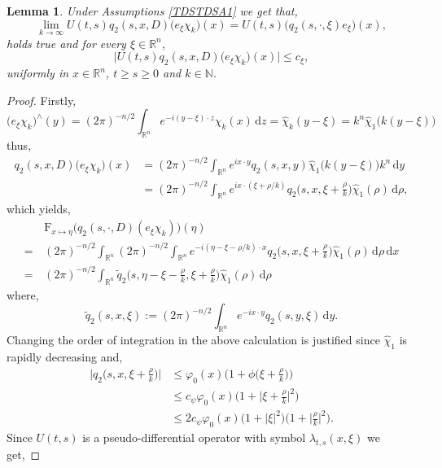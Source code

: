 \documentclass[a4paper, 12pt]{report}
\newtheorem{lemma}[theorem]{Lemma}
\theoremstyle{cor}
\theoremstyle{remark}
\theoremstyle{definition}
\begin{document}
\begin{lemma}\label{TDSSoAPL3}
Under Assumptions \ref{TDSTDSA1} we get that,
$$
\lim_{k \to \infty}U(t, s)q_2(s, x, D)\big(e_\xi\chi_k\big)(x) = U(t, s)\big(q_2(s, \cdot, \xi)e_\xi\big)(x),
$$
holds true and for every $\xi \in \mathbb{R}^n$,
$$
\big|U(t, s)q_2(s, x, D)\big(e_\xi\chi_k\big)(x)\big| \le c_\xi,
$$
uniformly in $x \in \mathbb{R}^n$, $t \ge s \ge 0$ and $k \in \mathbb{N}$.
\end{lemma}
\begin{proof}
Firstly,
$$
\big(e_\xi\chi_k\big)^\wedge(y) = (2\pi)^{-n/2}\int_{\mathbb{R}^n}e^{-i(y - \xi)\cdot z}\chi_k(x)\,\mathrm{d}z = \hat{\chi}_k(y - \xi) = k^n\hat{\chi}_1\big(k(y - \xi)\big)
$$
thus,
$$
\begin{aligned}
q_2(s, x, D)\big(e_\xi\chi_k\big)(x) & = (2\pi)^{-n/2}\int_{\mathbb{R}^n}e^{ix\cdot y}q_2(s, x, y)\hat{\chi}_1\big(k(y - \xi)\big)k^n\,\mathrm{d}y\\
& = (2\pi)^{-n/2}\int_{\mathbb{R}^n}e^{ix\cdot(\xi + \rho/k)}q_2\Big(s, x, \xi + \frac{\rho}{k}\Big)\hat{\chi}_1(\rho)\,\mathrm{d}\rho,
\end{aligned}
$$
which yields,
$$
\begin{aligned}
& \, \mathrm{F}_{x \mapsto \eta}\big(q_2(s, \cdot, D)(e_\xi\chi_k)\big)(\eta)\\
= & \, (2\pi)^{-n/2}\int_{\mathbb{R}^n}(2\pi)^{-n/2}\int_{\mathbb{R}^n}e^{-i(\eta - \xi - \rho/k)\cdot x}q_2\Big(s, x, \xi + \frac{\rho}{k}\Big)\hat{\chi}_1(\rho)\,\mathrm{d}\rho\,\mathrm{d}x\\
= & \, (2\pi)^{-n/2}\int_{\mathbb{R}^n}\tilde{q}_2\Big(s, \eta - \xi - \frac{\rho}{k}, \xi + \frac{\rho}{k}\Big)\hat{\chi}_1(\rho)\,\mathrm{d}\rho
\end{aligned}
$$
where,
$$
\tilde{q}_2(s, x, \xi) := (2\pi)^{-n/2}\int_{\mathbb{R}^n}e^{-ix\cdot y}q_2(s, y, \xi)\,\mathrm{d}y.
$$
Changing the order of integration in the above calculation is justified since $\hat{\chi}_1$ is rapidly decreasing and,
$$
\begin{aligned}
\Big|q_2\Big(s, x, \xi + \frac{\rho}{k}\Big)\Big| & \le \varphi_0(x)\bigg(1 + \phi\Big(\xi + \frac{\rho}{k}\Big)\bigg)\\
& \le c_\psi\varphi_0(x)\bigg(1 + \Big|\xi + \frac{\rho}{k}\Big|^2\bigg)\\
& \le 2c_\psi\varphi_0(x)\big(1 + |\xi|^2\big)\bigg(1 + \Big|\frac{\rho}{k}\Big|^2\bigg).
\end{aligned}
$$
Since $U(t, s)$ is a pseudo-differential operator with symbol $\lambda_{t, s}(x, \xi)$ we get,

\end{proof}
\end{document}
